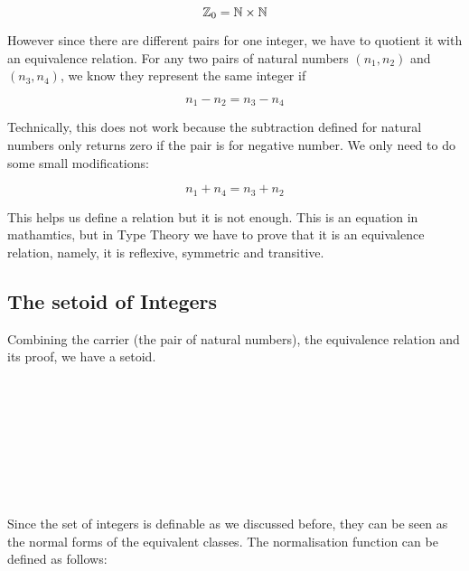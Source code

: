 $$\mathbb{Z}_0=\mathbb{N} \times \mathbb{N}$$

However since there are different pairs for one integer, we have to
quotient it with an equivalence relation. For any two pairs of natural
numbers $(n_1, n_2)$ and $(n_3, n_4)$, we know they represent the same
integer if

$$ n_1 - n_2 = n_3 - n_4$$

Technically, this does not work because the subtraction defined for natural
numbers only returns zero if the pair is for negative number. We only
need to do some small modifications:

$$ n_1 + n_4 = n_3 + n_2$$

This helps us define a relation but it is not enough. This is an
equation in mathamtics, but in Type Theory we have to prove that it is an
equivalence relation, namely, it is reflexive, symmetric and transitive.

\subsection{The setoid of Integers}

Combining the carrier (the pair of natural numbers), the equivalence
relation and its proof, we have a setoid.

\begin{code}
\\
\> \AgdaSymbol{:} \<%
\\
\> \AgdaSymbol{=} \<%
\\
\>[2]\<[3]%
\>[3]\AgdaSymbol{\{}  \<[19]%
\>[19]\AgdaSymbol{=} \<%
\\
\>[2]\<[3]%
\>[3]\AgdaSymbol{;}  \<[19]%
\>[19]\AgdaSymbol{=} \<%
\\
\>[2]\<[3]%
\>[3]\AgdaSymbol{;}  \AgdaSymbol{=} \<%
\\
\>[2]\<[3]%
\>[3]\AgdaSymbol{\}}\<%
\\
\end{code}

Since the set of integers is definable as we discussed before, they can
be seen as the normal forms of the equivalent classes. The normalisation
function can be defined as follows:
 
